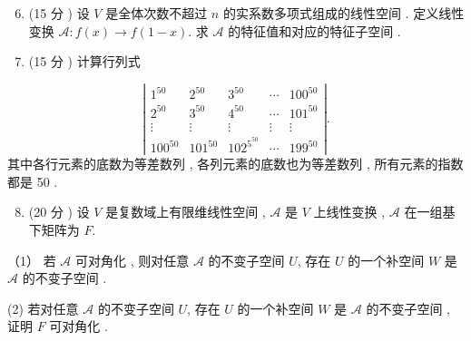 \documentclass[10pt]{article}
\begin{document}
\begin{enumerate}
  \setcounter{enumi}{5}
  \item (15  分 )  设  $V$  是全体次数不超过  $n$  的实系数多项式组成的线性空间 .  定义线性变换  $\mathscr{A}: f(x) \rightarrow f(1-x)$.  求  $\mathscr{A}$  的特征值和对应的特征子空间 .

  \item (15  分 )  计算行列式 

\end{enumerate}
$$
\left|\begin{array}{ccccc}
1^{50} & 2^{50} & 3^{50} & \cdots & 100^{50} \\
2^{50} & 3^{50} & 4^{50} & \cdots & 101^{50} \\
\vdots & \vdots & \vdots & \vdots & \vdots \\
100^{50} & 101^{50} & 102^{5^{50}} & \cdots & 199^{50}
\end{array}\right| .
$$
 其中各行元素的底数为等差数列 ,  各列元素的底数也为等差数列 ,  所有元素的指数都是  50 .

\begin{enumerate}
  \setcounter{enumi}{7}
  \item (20  分 )  设  $V$  是复数域上有限维线性空间 , $\mathscr{A}$  是  $V$  上线性变换 , $\mathscr{A}$  在一组基下矩阵为  $F$.
\end{enumerate}
（1） 若  $\mathscr{A}$  可对角化 ,  则对任意  $\mathscr{A}$  的不变子空间  $U$,  存在  $U$  的一个补空间  $W$  是  $\mathscr{A}$  的不变子空间 .

(2)  若对任意  $\mathscr{A}$  的不变子空间  $U$,  存在  $U$  的一个补空间  $W$  是  $\mathscr{A}$  的不变子空间 ,  证明  $F$  可对角化 .
\end{document}
